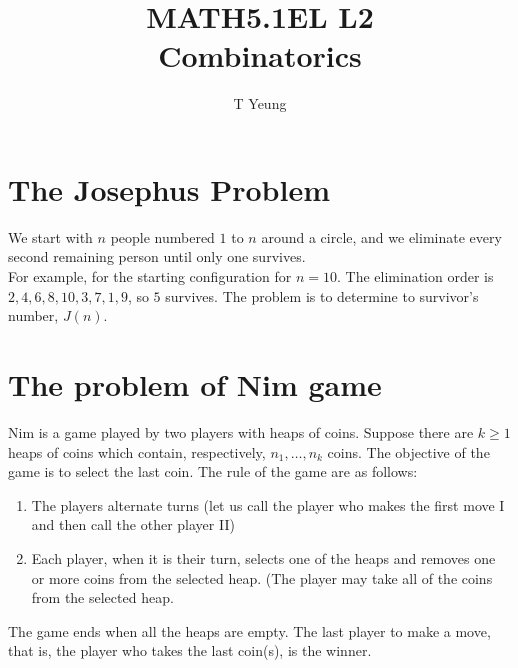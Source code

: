 \documentclass[addpoints]{exam}
\title{MATH5.1EL L2 \\ Combinatorics}
\author{T Yeung}
\date{}
\begin{document}
\maketitle

\begin{center}
\end{center}
\vspace{0.1in}
\vspace{0.3in}

\section{The Josephus Problem}
We start with $n$ people numbered $1$ to $n$ around a circle, and we eliminate every second remaining person until only one survives. \\
For example, for the starting configuration for $n = 10$. The elimination order is $2, 4, 6, 8, 10, 3, 7, 1, 9$, so $5$ survives. The problem is to determine to survivor's number, $J(n)$.

\newpage
\section{The problem of Nim game}
Nim is a game played by two players with heaps of coins. Suppose there are $k \geq 1$ heaps of coins which contain, respectively, $n_1, \ldots, n_k$ coins. The objective of the game is to select the last coin. The rule of the game are as follows:
\begin{enumerate}
	\item The players alternate turns (let us call the player who makes the first move I and then call the other player II)
	\item Each player, when it is their turn, selects one of the heaps and removes one or more coins from the selected heap. (The player may take all of the coins from the selected heap.
\end{enumerate}
The game ends when all the heaps are empty. The last player to make a move, that is, the player who takes the last coin(s), is the winner.

\noindent
\end{document}
